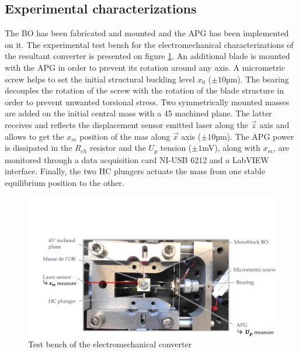 \documentclass[3p,twocolumn,preprint]{elsarticle}
\begin{document}
	\subsection{Experimental characterizations}	
	\label{subsec:Experimental characterizations}
The BO has been fabricated and mounted and the APG has been implemented on it. The experimental test bench for the electromechanical characterizations of the resultant converter is presented on figure \ref{fig:BDT_OB+GPA}. An additional blade is mounted with the APG in order to prevent its rotation around any axis. A micrometric screw helps to set the initial structural buckling level $x_0$ ($\pm 10$µm). The bearing decouples the rotation of the screw with the rotation of the blade structure in order to prevent unwanted torsional stress. Two symmetrically mounted masses are added on the initial central mass with a 45\degree{} machined plane. The latter receives and reflects the displacement sensor emitted laser along the $\vec{z}$ axis and allows to get the $x_m$ position of the mas along $\vec{x}$ axis ($\pm 10$µm). The APG power is dissipated in the $R_{ch}$ resistor and the $U_p$ tension ($\pm 1$mV), along with $x_m$, are monitored through a data acquisition card NI-USB 6212 and a LabVIEW interface. Finally, the two HC plungers actuate the mass from one stable equilibrium position to the other.
\begin{figure}[!htbp]
	\centering
	\captionsetup{justification=centering}
	\includegraphics[trim={2cm 0cm 0cm 5.5cm},clip,width=\linewidth]{figures/BDT_OB+GPA.pdf}
	\caption{Test bench of the electromechanical converter}
	\label{fig:BDT_OB+GPA}
\end{figure}
\end{document}
